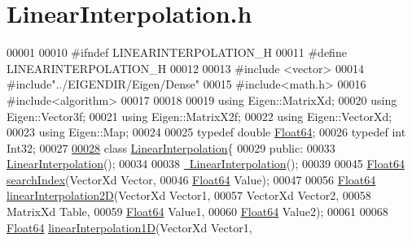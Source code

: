 \hypertarget{_linear_interpolation_8h_source}{}\section{Linear\+Interpolation.\+h}
\label{_linear_interpolation_8h_source}

\begin{DoxyCode}
00001 
00010 \textcolor{preprocessor}{#ifndef LINEARINTERPOLATION\_H}
00011 \textcolor{preprocessor}{#define LINEARINTERPOLATION\_H}
00012 
00013 \textcolor{preprocessor}{#include <vector>}
00014 \textcolor{preprocessor}{#include"../EIGENDIR/Eigen/Dense"}
00015 \textcolor{preprocessor}{#include<math.h>}
00016 \textcolor{preprocessor}{#include<algorithm>}
00017 
00018 
00019 \textcolor{keyword}{using} Eigen::MatrixXd;
00020 \textcolor{keyword}{using} Eigen::Vector3f;
00021 \textcolor{keyword}{using} Eigen::MatrixX2f;
00022 \textcolor{keyword}{using} Eigen::VectorXd;
00023 \textcolor{keyword}{using} Eigen::Map;
00024 
00025 \textcolor{keyword}{typedef} \textcolor{keywordtype}{double} \hyperlink{group___tools_ga3f1431cb9f76da10f59246d1d743dc2c}{Float64};
00026 \textcolor{keyword}{typedef} \textcolor{keywordtype}{int}    Int32;
00027 
\hyperlink{class_linear_interpolation}{00028} \textcolor{keyword}{class }\hyperlink{class_linear_interpolation}{LinearInterpolation}\{
00029 \textcolor{keyword}{public}:
00033     \hyperlink{class_linear_interpolation_aaae2ec77e7767bb5fc7ca34a6e1197f1}{LinearInterpolation}();
00034 
00038     \hyperlink{class_linear_interpolation_a36a34fa39c430e05bdc073c1ac9ad4df}{~LinearInterpolation}();
00039 
00045     \hyperlink{group___tools_ga3f1431cb9f76da10f59246d1d743dc2c}{Float64} \hyperlink{class_linear_interpolation_a0be6504a98fabcd63d81d30a2d2d9add}{searchIndex}(VectorXd Vector,
00046                         \hyperlink{group___tools_ga3f1431cb9f76da10f59246d1d743dc2c}{Float64} Value);
00047 
00056     \hyperlink{group___tools_ga3f1431cb9f76da10f59246d1d743dc2c}{Float64} \hyperlink{class_linear_interpolation_a6b143368c20db0d2cda905a86391f83f}{linearInterpolation2D}(VectorXd Vector1,
00057                                   VectorXd Vector2,
00058                                   MatrixXd Table,
00059                                   \hyperlink{group___tools_ga3f1431cb9f76da10f59246d1d743dc2c}{Float64} Value1,
00060                                   \hyperlink{group___tools_ga3f1431cb9f76da10f59246d1d743dc2c}{Float64} Value2);
00061 
00068     \hyperlink{group___tools_ga3f1431cb9f76da10f59246d1d743dc2c}{Float64} \hyperlink{class_linear_interpolation_a76b750166902dedda7e44ed0b8170094}{linearInterpolation1D}(VectorXd Vector1,

\end{DoxyCode}
